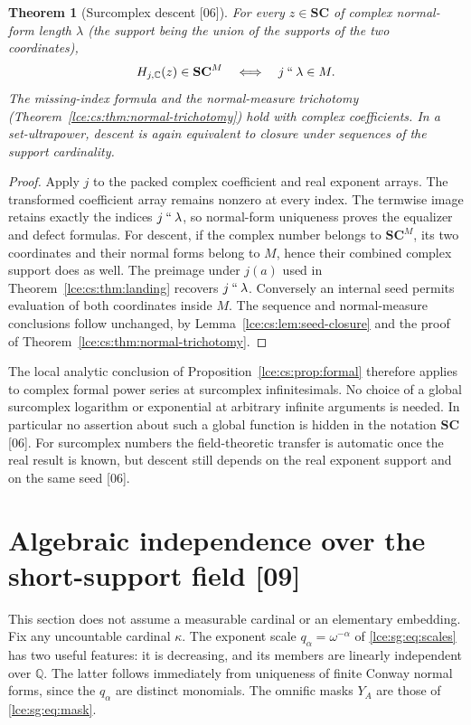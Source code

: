 \documentclass[11pt,letterpaper]{article}
\numberwithin{equation}{section}
\newtheorem{theorem}{Theorem}[section]
\theoremstyle{definition}
\theoremstyle{remark}
\newcommand{\SC}{\mathbf{SC}}
\newcommand{\C}{\mathbb C}
\newcommand{\Q}{\mathbb Q}
\newcommand{\Hc}{H_{j,\C}}
\newcommand{\imset}[2]{#1\mathbin{``}#2}
\newcommand{\thref}[1]{Theorem~\ref{#1}}
\newcommand{\prref}[1]{Proposition~\ref{#1}}
\newcommand{\leref}[1]{Lemma~\ref{#1}}
\newcommand{\src}[1]{\textup{\textsf{\small[#1]}}}%
\begin{document}
\begin{theorem}[Surcomplex descent \src{06}]\label{lce:cs:thm:complex}
For every $z\in\SC$ of complex normal-form length $\lambda$ (the support
being the union of the supports of the two coordinates),
\[
 \Hc(z)\in\SC^M\quad\Longleftrightarrow\quad\imset j\lambda\in M.
\]
The missing-index formula and the normal-measure trichotomy
(\thref{lce:cs:thm:normal-trichotomy}) hold with complex coefficients. In a
set-ultrapower, descent is again equivalent to closure under sequences of
the support cardinality.
\end{theorem}
\begin{proof}
Apply $j$ to the packed complex coefficient and real exponent arrays. The
transformed coefficient array remains nonzero at every index. The termwise
image retains exactly the indices $\imset j\lambda$, so normal-form
uniqueness proves the equalizer and defect formulas. For descent, if the
complex number belongs to $\SC^M$, its two coordinates and their normal
forms belong to $M$, hence their combined complex support does as well. The
preimage under $j(a)$ used in \thref{lce:cs:thm:landing} recovers
$\imset j\lambda$. Conversely an internal seed permits evaluation of both
coordinates inside $M$. The sequence and normal-measure conclusions follow
unchanged, by \leref{lce:cs:lem:seed-closure} and the proof of
\thref{lce:cs:thm:normal-trichotomy}.
\end{proof}
The local analytic conclusion of \prref{lce:cs:prop:formal} therefore
applies to complex formal power series at surcomplex infinitesimals. No
choice of a global surcomplex logarithm or exponential at arbitrary
infinite arguments is needed. In particular no assertion about such a
global function is hidden in the notation $\SC$ \src{06}. For surcomplex
numbers the field-theoretic transfer is automatic once the real result is
known, but descent still depends on the real exponent support and on the
same seed \src{06}.

\section{Algebraic independence over the short-support field \src{09}}
\label{lce:sg:sec:independence}

This section does not assume a measurable cardinal or an elementary
embedding. Fix any uncountable cardinal $\kappa$. The exponent scale
$q_\alpha=\omega^{-\alpha}$ of \eqref{lce:sg:eq:scales} has two useful
features: it is decreasing, and its members are linearly independent over
$\Q$. The latter follows immediately from uniqueness of finite Conway normal
forms, since the $q_\alpha$ are distinct monomials. The omnific masks $Y_A$
are those of \eqref{lce:sg:eq:mask}.
\end{document}

